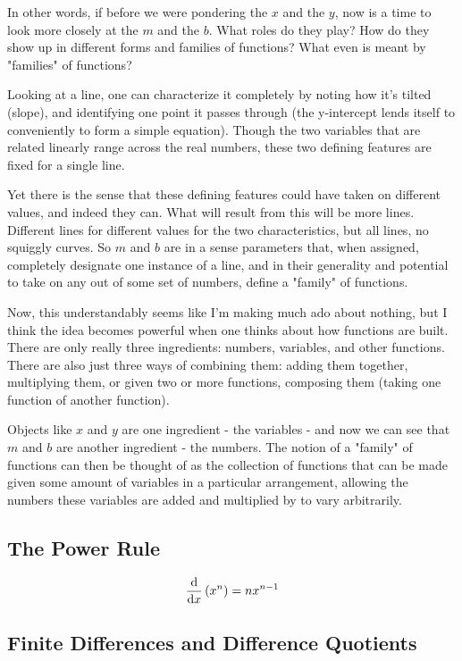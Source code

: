 \documentclass[a4paper]{article}
\begin{document}
In other words, if before we were pondering the $x$ and the $y$, now is a time to look more closely at the $m$ and the $b$. What roles do they play? How do they show up in different forms and families of functions? What even is meant by "families" of functions?

Looking at a line, one can characterize it completely by noting how it's tilted (slope), and identifying one point it passes through (the y-intercept lends itself to conveniently to form a simple equation). Though the two variables that are related linearly range across the real numbers, these two defining features are fixed for a single line.

Yet there is the sense that these defining features could have taken on different values, and indeed they can. What will result from this will be more lines. Different lines for different values for the two characteristics, but all lines, no squiggly curves. So $m$ and $b$ are in a sense parameters that, when assigned, completely designate one instance of a line, and in their generality and potential to take on any out of some set of numbers, define a "family" of functions.

Now, this understandably seems like I'm making much ado about nothing, but I think the idea becomes powerful when one thinks about how functions are built. There are only really three ingredients: numbers, variables, and other functions. There are also just three ways of combining them: adding them together, multiplying them, or given two or more functions, composing them (taking one function of another function). 

Objects like $x$ and $y$ are one ingredient - the variables - and now we can see that $m$ and $b$ are another ingredient - the numbers. The notion of a "family" of functions can then be thought of as the collection of functions that can be made given some amount of variables in a particular arrangement, allowing the numbers these variables are added and multiplied by to vary arbitrarily.

\subsection{The Power Rule}

$$ \dv{}{x}\left(x^n\right)  = nx^{n-1} $$

\subsection{Finite Differences and Difference Quotients}
\end{document}
